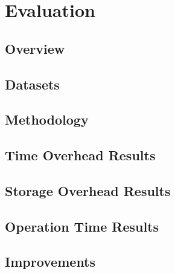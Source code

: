 \chapter{Evaluation}

\section{Overview}

\section{Datasets}

\section{Methodology}

\section{Time Overhead Results}

\section{Storage Overhead Results}

\section{Operation Time Results}

\section{Improvements}
